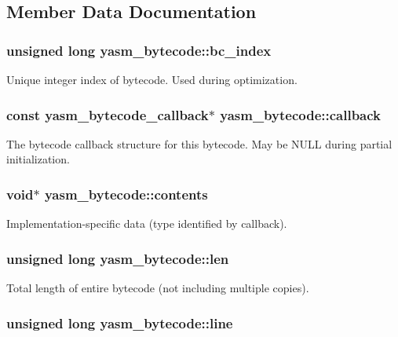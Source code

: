 \subsection{Member Data Documentation}
\hypertarget{structyasm__bytecode_a730dd36c4cec9b68bd7e9386abf7ea88}{
\subsubsection[{bc\-\_\-index}]{\setlength{\rightskip}{0pt plus 5cm}unsigned long yasm\-\_\-bytecode\-::bc\-\_\-index}}\label{structyasm__bytecode_a730dd36c4cec9b68bd7e9386abf7ea88}
Unique integer index of bytecode. Used during optimization. \hypertarget{structyasm__bytecode_ace189691da8c8737afb7a664cd753fcd}{
\subsubsection[{callback}]{\setlength{\rightskip}{0pt plus 5cm}const {\bf yasm\-\_\-bytecode\-\_\-callback}$\ast$ yasm\-\_\-bytecode\-::callback}}\label{structyasm__bytecode_ace189691da8c8737afb7a664cd753fcd}
The bytecode callback structure for this bytecode. May be N\-U\-L\-L during partial initialization. \hypertarget{structyasm__bytecode_a00b5eeb6ac2908972964ec3daef631c1}{
\subsubsection[{contents}]{\setlength{\rightskip}{0pt plus 5cm}void$\ast$ yasm\-\_\-bytecode\-::contents}}\label{structyasm__bytecode_a00b5eeb6ac2908972964ec3daef631c1}
Implementation-\/specific data (type identified by callback). \hypertarget{structyasm__bytecode_aa75a5201d1c9735d144555d277a05d6f}{
\subsubsection[{len}]{\setlength{\rightskip}{0pt plus 5cm}unsigned long yasm\-\_\-bytecode\-::len}}\label{structyasm__bytecode_aa75a5201d1c9735d144555d277a05d6f}
Total length of entire bytecode (not including multiple copies). \hypertarget{structyasm__bytecode_ac0e7238f4ee5628c88ceedb58c46cd15}{
\subsubsection[{line}]{\setlength{\rightskip}{0pt plus 5cm}unsigned long yasm\-\_\-bytecode\-::line}}\label{structyasm__bytecode_ac0e7238f4ee5628c88ceedb58c46cd15}
